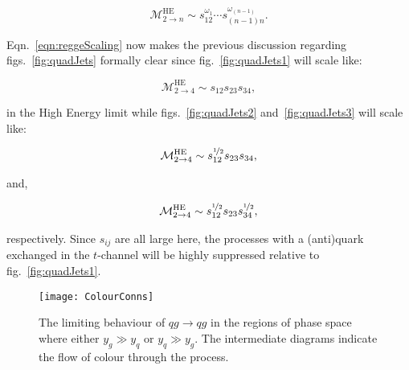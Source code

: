	\begin{equation}
		\mathcal{M}^{\text{HE}}_{2\to n}\sim s_{12}^{\omega_1}\cdots s_{(n-1)n}^{\omega_{(n-1)}}.
		\label{eqn:reggeScaling}
	\end{equation}

	Eqn.~\eqref{eqn:reggeScaling} now makes the previous discussion regarding figs.~\eqref{fig:quadJets}
	formally clear since fig.~\eqref{fig:quadJets1} will scale like:

	\begin{equation}
		\mathcal{M}^{\text{HE}}_{2\to 4} \sim s_{12}s_{23}s_{34},
	\end{equation}

	in the High Energy limit while figs.~\eqref{fig:quadJets2} and~\eqref{fig:quadJets3} will scale
	like:

	\begin{align}
	\begin{split}
		\mathcal{M}^{\text{HE}}_{2\to 4} \sim s_{12}^{\nicefrac{1}{2}}s_{23}s_{34},\\
	\end{split}
	\end{align}

	and,

	\begin{align}
	\begin{split}
		\mathcal{M}^{\text{HE}}_{2\to 4} \sim s_{12}^{\nicefrac{1}{2}}s_{23}s_{34}^{\nicefrac{1}{2}},
	\end{split}
	\end{align}

	respectively.  Since $s_{ij}$ are all large here, the processes with a (anti)quark exchanged
	in the $t$-channel will be highly suppressed relative to fig.~\eqref{fig:quadJets1}.

	\begin{figure}[hbt]
		\begin{center}
		\texttt{[image: ColourConns]}
		\caption{The limiting behaviour of $qg\to qg$ in the regions of phase space where
		either $y_g\gg y_q$ or $y_q\gg y_g$.  The intermediate diagrams indicate the flow
		of colour through the process.}
		\label{fig:colorConns}
		\end{center}
	\end{figure}

